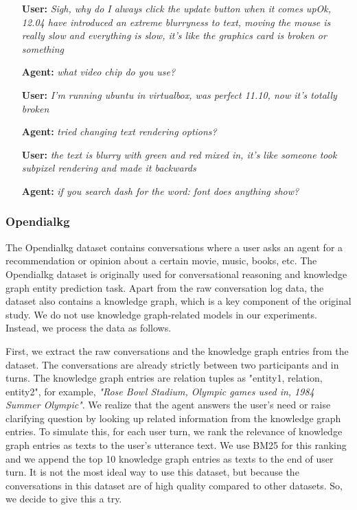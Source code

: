 \documentclass[format=acmsmall, review=False, screen=true]{acmart}
\begin{document}
\begin{itemize}
    \item[\textbf{User:}] \textit{Sigh, why do I always click the update button when it comes upOk, 12.04 have introduced an extreme blurryness to text, moving the mouse is really slow and everything is slow, it's like the graphics card is broken or something}
    
    \item[\textbf{Agent:}] \textit{what video chip do you use?}
    
    \item[\textbf{User:}] \textit{I'm running ubuntu in virtualbox, was perfect 11.10, now it's totally broken}

    \item[\textbf{Agent:}] \textit{tried changing text rendering options?}
    
    \item[\textbf{User:}] \textit{the text is blurry with green and red mixed in, it's like someone took subpixel rendering and made it backwards}
    
    \item[\textbf{Agent:}] \textit{if you search dash for the word: font does anything show?}
    
\end{itemize}

\subsubsection{\textbf{Opendialkg}}

The Opendialkg dataset contains conversations where a user asks an agent for a recommendation or opinion about a certain movie, music, books, etc. The Opendialkg dataset is originally used for conversational reasoning and knowledge graph entity prediction task. Apart from the raw conversation log data, the dataset also contains a knowledge graph, which is a key component of the original study. We do not use knowledge graph-related models in our experiments. Instead, we process the data as follows.

First, we extract the raw conversations and the knowledge graph entries from the dataset. The conversations are already strictly between two participants and in turns. The knowledge graph entries are relation tuples as "entity1, relation, entity2", for example, \textit{"Rose Bowl Stadium, Olympic games used in, 1984 Summer Olympic"}. We realize that the agent answers the user's need or raise clarifying question by looking up related information from the knowledge graph entries. To simulate this, for each user turn, we rank the relevance of knowledge graph entries as texts to the user's utterance text. We use BM25 for this ranking and we append the top 10 knowledge graph entries as texts to the end of user turn. It is not the most ideal way to use this dataset, but because the conversations in this dataset are of high quality compared to other datasets. So, we decide to give this a try.
\end{document}
